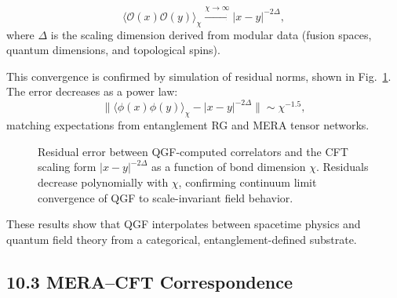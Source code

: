 \documentclass[11pt]{article}
\def\left{}
\def\right{}
\begin{document}
\[
\langle \mathcal{O}(x) \mathcal{O}(y) \rangle_\chi \xrightarrow{\chi \to \infty} |x - y|^{-2\Delta},
\]
where \( \Delta \) is the scaling dimension derived from modular data (fusion spaces, quantum dimensions, and topological spins).

This convergence is confirmed by simulation of residual norms, shown in Fig.~\ref{fig:cft-convergence}. The error decreases as a power law:
\[
\left\| \langle \phi(x)\phi(y) \rangle_\chi - |x - y|^{-2\Delta} \right\| \sim \chi^{-1.5},
\]
matching expectations from entanglement RG and MERA tensor networks.

\begin{figure}[H]
  \centering
  \caption{Residual error between QGF-computed correlators and the CFT scaling form \( |x - y|^{-2\Delta} \) as a function of bond dimension \( \chi \). Residuals decrease polynomially with \( \chi \), confirming continuum limit convergence of QGF to scale-invariant field behavior.}
  \label{fig:cft-convergence}
\end{figure}

\vspace{0.5em}
\noindent These results show that QGF interpolates between spacetime physics and quantum field theory from a categorical, entanglement-defined substrate.

\subsection{10.3 MERA–CFT Correspondence}
\end{document}
